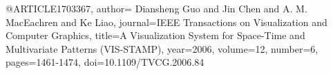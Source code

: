 @ARTICLE{1703367,
  author={ {Diansheng Guo} and  {Jin Chen} and A. M. {MacEachren} and  {Ke Liao}},
  journal={IEEE Transactions on Visualization and Computer Graphics}, 
  title={A Visualization System for Space-Time and Multivariate Patterns (VIS-STAMP)}, 
  year={2006},
  volume={12},
  number={6},
  pages={1461-1474},
  doi={10.1109/TVCG.2006.84}}